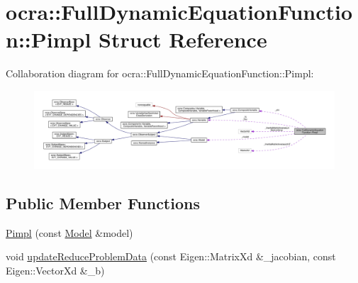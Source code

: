 \hypertarget{structFullDynamicEquationFunction_1_1Pimpl}{}\section{ocra\+:\+:Full\+Dynamic\+Equation\+Function\+:\+:Pimpl Struct Reference}
\label{structFullDynamicEquationFunction_1_1Pimpl}


Collaboration diagram for ocra\+:\+:Full\+Dynamic\+Equation\+Function\+:\+:Pimpl\+:\nopagebreak
\begin{figure}[H]
\begin{center}
\leavevmode
\includegraphics[width=350pt]{d6/d01/structFullDynamicEquationFunction_1_1Pimpl__coll__graph}
\end{center}
\end{figure}
\subsection*{Public Member Functions}
\begin{DoxyCompactItemize}
\item 
\hyperlink{structFullDynamicEquationFunction_1_1Pimpl_acc3b35606d52aa163f27d80f49cb3aaf}{Pimpl} (const \hyperlink{classocra_1_1Model}{Model} \&model)
\item 
void \hyperlink{structFullDynamicEquationFunction_1_1Pimpl_a4d1df4cadec603942aeb750212a2d258}{update\+Reduce\+Problem\+Data} (const Eigen\+::\+Matrix\+Xd \&\+\_\+jacobian, const Eigen\+::\+Vector\+Xd \&\+\_\+b)
\end{DoxyCompactItemize}
